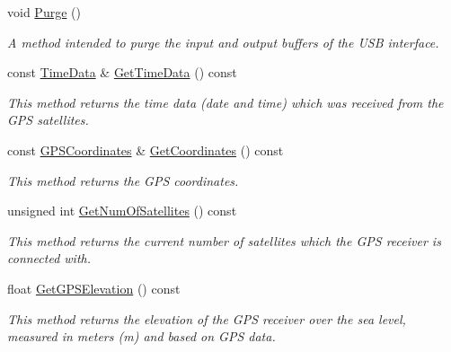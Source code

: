 \begin{DoxyCompactItemize}
\mbox{\label{classGPSInterface_a698c9b38eaaa36fef1abcbc19614e2ad}} 
void \hyperlink{classGPSInterface_a698c9b38eaaa36fef1abcbc19614e2ad}{Purge} ()
\begin{DoxyCompactList}\small\item\em A method intended to purge the input and output buffers of the U\+SB interface. \end{DoxyCompactList}\item 
\mbox{\label{classGPSInterface_a6ca2cb996a9ed3c6cd436491c56aab18}} 
const \hyperlink{structTimeData}{Time\+Data} \& \hyperlink{classGPSInterface_a6ca2cb996a9ed3c6cd436491c56aab18}{Get\+Time\+Data} () const
\begin{DoxyCompactList}\small\item\em This method returns the time data (date and time) which was received from the G\+PS satellites. \end{DoxyCompactList}\item 
\mbox{\label{classGPSInterface_a9c827a6ce3078c5e748105019b75e0e0}} 
const \hyperlink{structGPSCoordinates}{G\+P\+S\+Coordinates} \& \hyperlink{classGPSInterface_a9c827a6ce3078c5e748105019b75e0e0}{Get\+Coordinates} () const
\begin{DoxyCompactList}\small\item\em This method returns the G\+PS coordinates. \end{DoxyCompactList}\item 
\mbox{\label{classGPSInterface_ab07cafce284ff50540a2be5b00410e34}} 
unsigned int \hyperlink{classGPSInterface_ab07cafce284ff50540a2be5b00410e34}{Get\+Num\+Of\+Satellites} () const
\begin{DoxyCompactList}\small\item\em This method returns the current number of satellites which the G\+PS receiver is connected with. \end{DoxyCompactList}\item 
\mbox{\label{classGPSInterface_ac70e16c9a95f440bc8ff58429b0db42a}} 
float \hyperlink{classGPSInterface_ac70e16c9a95f440bc8ff58429b0db42a}{Get\+G\+P\+S\+Elevation} () const
\begin{DoxyCompactList}\small\item\em This method returns the elevation of the G\+PS receiver over the sea level, measured in meters (m) and based on G\+PS data. \end{DoxyCompactList}\item 

\end{DoxyCompactItemize}
